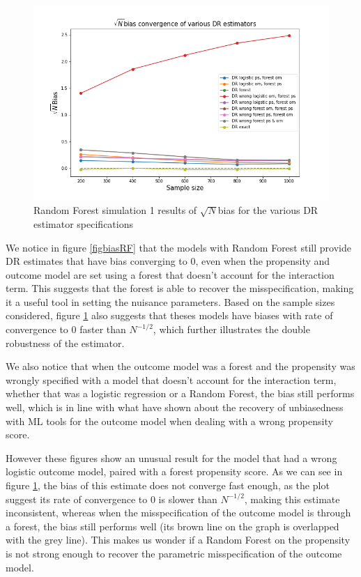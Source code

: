 \documentclass[12pt,twoside]{article}
\begin{document}
\begin{figure} 
    \centering
    \includegraphics[width = 0.9\columnwidth]{figures/sqrtnRF.png}
    \caption{Random Forest simulation 1 results of $\sqrt{N}$bias for the various DR estimator specifications}
    \label{figsqrtnRF}
\end{figure}

We notice in figure \ref{figbiasRF} that the models with Random Forest still provide DR estimates that have bias converging to 0, even when the propensity and outcome model are set using a forest that doesn't account for the interaction term. This suggests that the forest is able to recover the misspecification, making it a useful tool in setting the nuisance parameters. Based on the sample sizes considered, figure \ref{figsqrtnRF} also suggests that theses models have biases with rate of convergence to 0 faster than $N^{-1/2}$, which further illustrates the double robustness of the estimator.

We also notice that when the outcome model was a forest and the propensity was wrongly specified with a model that doesn't account for the interaction term, whether that was a logistic regression or a Random Forest, the bias still performs well, which is in line with what \citet{ps_SL} have shown about the recovery of unbiasedness with ML tools for the outcome model when dealing with a wrong propensity score. 

However these figures show an unusual result for the model that had a wrong logistic outcome model, paired with a forest propensity score. As we can see in figure \ref{figsqrtnRF}, the bias of this estimate does not converge fast enough, as the plot suggest its rate of convergence to 0 is slower than $N^{-1/2}$, making this estimate inconsistent, whereas when the misspecification of the outcome model is through a forest, the bias still performs well (its brown line on the graph is overlapped with the grey line). This makes us wonder if a Random Forest on the propensity is not strong enough to recover the parametric misspecification of the outcome model.
\end{document}
